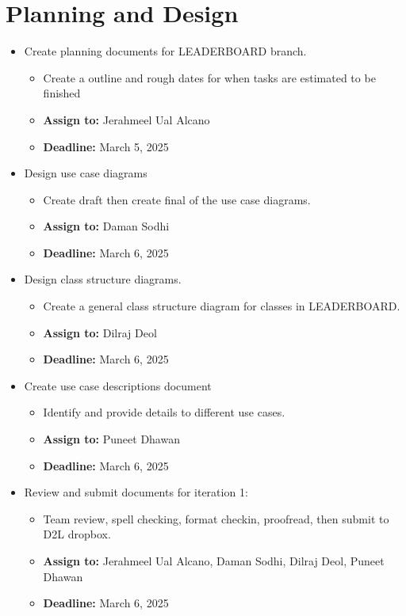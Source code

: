 \documentclass{report}
\begin{document}
\section{Planning and Design}
\begin{itemize}
    \item Create planning documents for LEADERBOARD branch.
    \begin{itemize}
        \item Create a outline and rough dates for when tasks are estimated to be finished
        \item \textbf{Assign to:} Jerahmeel Ual Alcano
        \item \textbf{Deadline:} March 5, 2025
    \end{itemize}
    \item Design use case diagrams
    \begin{itemize}
        \item Create draft then create final of the use case diagrams.
        \item \textbf{Assign to:} Daman Sodhi
        \item \textbf{Deadline:} March 6, 2025
    \end{itemize}
    \item Design class structure diagrams.
    \begin{itemize}
        \item Create a general class structure diagram for classes in LEADERBOARD.
        \item \textbf{Assign to:} Dilraj Deol
        \item \textbf{Deadline:} March 6, 2025
    \end{itemize}
    \item Create use case descriptions document
    \begin{itemize}
        \item Identify and provide details to different use cases.
        \item \textbf{Assign to:} Puneet Dhawan
        \item \textbf{Deadline:} March 6, 2025
    \end{itemize}
    \item Review and submit documents for iteration 1:
    \begin{itemize}
        \item Team review, spell checking, format checkin, proofread, then submit to D2L dropbox.
        \item \textbf{Assign to:} Jerahmeel Ual Alcano, Daman Sodhi, Dilraj Deol, Puneet Dhawan
        \item \textbf{Deadline:} March 6, 2025
    \end{itemize}
\end{itemize}
\end{document}
